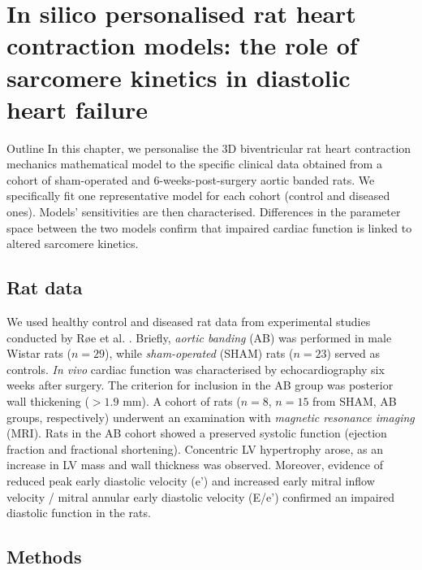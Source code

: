 \chapter{In silico personalised rat heart contraction models: the role of sarcomere kinetics in diastolic heart failure}\label{cha:chapter4}
%
%
%
\begin{remark}{Outline}
    In this chapter, we personalise the $3$D biventricular rat heart contraction mechanics mathematical model to the specific clinical data obtained from a cohort of sham-operated and $6$-weeks-post-surgery aortic banded rats. We specifically fit one representative model for each cohort (control and diseased ones). Models' sensitivities are then characterised. Differences in the parameter space between the two models confirm that impaired cardiac function is linked to altered sarcomere kinetics. 
\end{remark}


%
%
%
\section{Rat data}
We used healthy control and diseased rat data from experimental studies conducted by R{\o}e et al. \cite{Roe:2017}. Briefly, \textit{aortic banding} (\acs{AB}) was performed in male Wistar rats ($n=29$), while \textit{sham-operated} (\acs{SHAM}) rats ($n=23$) served as controls. \textit{In vivo} cardiac function was characterised by echocardiography six weeks after surgery. The criterion for inclusion in the AB group was posterior wall thickening ($>1.9$ mm). A cohort of rats ($n=8$, $n=15$ from SHAM, AB groups, respectively) underwent an examination with \textit{magnetic resonance imaging} (\acs{MRI}). Rats in the AB cohort showed a preserved systolic function (ejection fraction and fractional shortening). Concentric LV hypertrophy arose, as an increase in LV mass and wall thickness was observed. Moreover, evidence of reduced peak early diastolic velocity (e’) and increased early mitral inflow velocity / mitral annular early diastolic velocity (E/e’) confirmed an impaired diastolic function in the rats.


%
%
%
\section{Methods}


